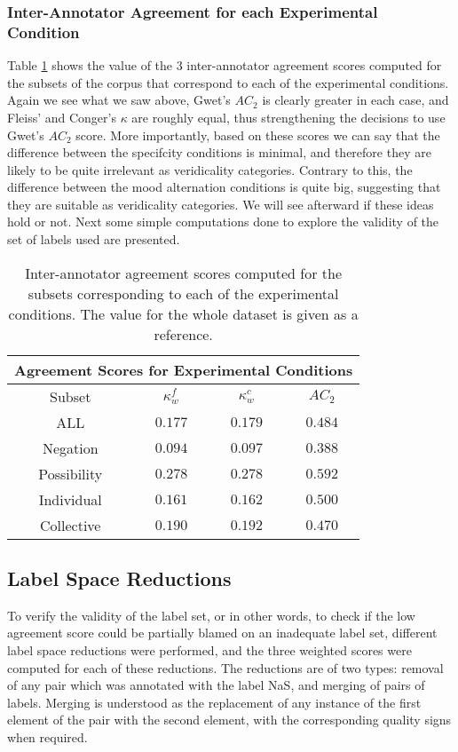 \subsubsection{Inter-Annotator Agreement for each Experimental Condition}
\label{subsubsec:expiaa}
Table \ref{tab:pilexpiaa} shows the value of the 3 inter-annotator agreement scores computed for the subsets of the corpus that correspond to each of the experimental conditions. Again we see what we saw above, Gwet's $AC_2$ is clearly greater in each case, and Fleiss' and Conger's $\kappa$ are roughly equal, thus strengthening the decisions to use Gwet's $AC_2$ score. More importantly, based on these scores we can say that the difference between the specifcity conditions is minimal, and therefore they are likely to be quite irrelevant as veridicality categories. Contrary to this, the difference between the mood alternation conditions is quite big, suggesting that they are suitable as veridicality categories. We will see afterward if these ideas hold or not. Next some simple computations done to explore the validity of the set of labels used are presented.\\

\begin{table}
\centering
\begin{tabular}{|c|c|c|c|}
\hline
\multicolumn{4}{|c|}{Agreement Scores for Experimental Conditions}\\\hline
Subset &  $\kappa^{f}_{w}$ & $\kappa^{c}_{w}$ & $AC_2$\\\hline
ALL & $0.177$ & $0.179$ & $0.484$\\\hline
Negation & $0.094$ & $0.097$ & $0.388$\\\hline
Possibility & $0.278$ & $0.278$ & $0.592$\\\hline
Individual & $0.161$ & $0.162$ & $0.500$\\\hline
Collective & $0.190$ & $0.192$ & $0.470$\\\hline
\end{tabular}
\caption[Inter-annotator agreement scores for experimental conditions.]{Inter-annotator agreement scores computed for the subsets corresponding to each of the experimental conditions. The value for the whole dataset is given as a reference.}
\label{tab:pilexpiaa}
\end{table}

\subsection{Label Space Reductions}
To verify the validity of the label set, or in other words, to check if the low agreement score could be partially blamed on an inadequate label set, different label space reductions were performed, and the three weighted scores were computed for each of these reductions. The reductions are of two types: removal of any pair which was annotated with the label NaS, and merging of pairs of labels. Merging is understood as the replacement of any instance of the first element of the pair with the second element, with the corresponding quality signs when required.\\


